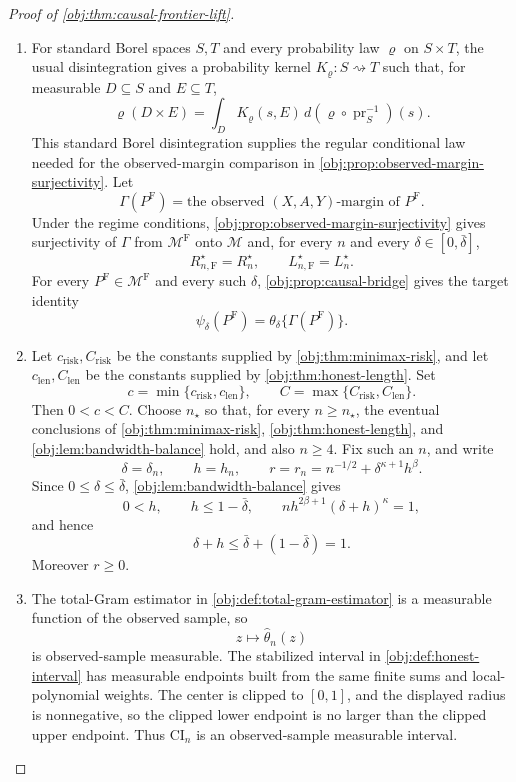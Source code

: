 \documentclass[11pt]{article}
\begin{document}
\begin{proof}[Proof of \cref{obj:thm:causal-frontier-lift}]
\begin{enumerate}
\item For standard Borel spaces \(S,T\) and every probability law \(\varrho\) on
\(S\times T\), the usual disintegration gives a probability kernel
\(K_\varrho:S\rightsquigarrow T\) such that, for measurable
\(D\subseteq S\) and \(E\subseteq T\),
\[
\varrho(D\times E)
=
\int_D K_\varrho(s,E)\,d(\varrho\circ \operatorname{pr}_S^{-1})(s).
\]
This standard Borel disintegration supplies the regular conditional law needed
for the observed-margin comparison in \cref{obj:prop:observed-margin-surjectivity}.
Let
\[
\Gamma(P^{\mathrm F})
=
\text{the observed }(X,A,Y)\text{-margin of }P^{\mathrm F}.
\]
Under the regime conditions, \cref{obj:prop:observed-margin-surjectivity} gives
surjectivity of \(\Gamma\) from \(\mathcal M^{\mathrm F}\) onto \(\mathcal M\) and,
for every \(n\) and every \(\delta\in[0,\bar\delta]\),
\[
R_{n,\mathrm F}^\star=R_n^\star,
\qquad
L_{n,\mathrm F}^\star=L_n^\star .
\]
For every \(P^{\mathrm F}\in\mathcal M^{\mathrm F}\) and every such \(\delta\),
\cref{obj:prop:causal-bridge} gives the target identity
\[
\psi_\delta(P^{\mathrm F})
=
\theta_\delta\{\Gamma(P^{\mathrm F})\}.
\]

\item Let \(c_{\mathrm{risk}},C_{\mathrm{risk}}\) be the constants supplied by
\cref{obj:thm:minimax-risk}, and let \(c_{\mathrm{len}},C_{\mathrm{len}}\)
be the constants supplied by \cref{obj:thm:honest-length}.  Set
\[
c=\min\{c_{\mathrm{risk}},c_{\mathrm{len}}\},
\qquad
C=\max\{C_{\mathrm{risk}},C_{\mathrm{len}}\}.
\]
Then \(0<c<C\).  Choose \(n_\star\) so that, for every \(n\ge n_\star\),
the eventual conclusions of \cref{obj:thm:minimax-risk},
\cref{obj:thm:honest-length}, and \cref{obj:lem:bandwidth-balance} hold, and
also \(n\ge4\).  Fix such an \(n\), and write
\[
\delta=\delta_n,
\qquad
h=h_n,
\qquad
r=r_n=n^{-1/2}+\delta^{\kappa+1}h^\beta .
\]
Since \(0\le\delta\le\bar\delta\), \cref{obj:lem:bandwidth-balance} gives
\[
0<h,
\qquad
h\le 1-\bar\delta,
\qquad
n h^{2\beta+1}(\delta+h)^\kappa=1,
\]
and hence
\[
\delta+h\le \bar\delta+(1-\bar\delta)=1.
\]
Moreover \(r\ge0\). %

\item The total-Gram estimator in \cref{obj:def:total-gram-estimator} is a
measurable function of the observed sample, so
\[
z\longmapsto
\widehat\theta_n(z)
\]
is observed-sample measurable.  The stabilized interval in
\cref{obj:def:honest-interval} has measurable endpoints built from the same
finite sums and local-polynomial weights.  The center is clipped to \([0,1]\),
and the displayed radius is nonnegative, so the clipped lower endpoint is no
larger than the clipped upper endpoint.  Thus \(\mathrm{CI}_n\) is an
observed-sample measurable interval. %


\end{enumerate}
\end{proof}
\end{document}
